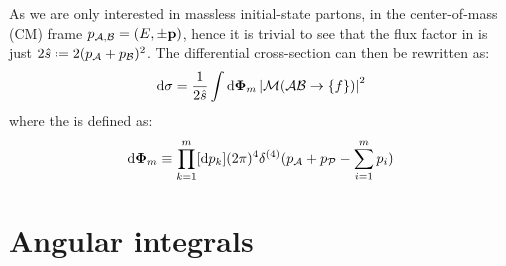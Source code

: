 As we are only interested in massless initial-state partons, in the center-of-mass (CM) frame $ p_{\mathcal{A},\mathcal{B}} = (E, \pm\mathbf{p}) $, hence it is trivial to see that the flux factor in  is just $ 2\hat{s} \defeq 2 (p_\mathcal{A} + p_\mathcal{B})^2 $. The differential cross-section can then be rewritten as:
\begin{equation}
  \mathrm{d} \sigma = \frac{1}{2\hat{s}} \int \mathrm{d} \boldsymbol{\Phi}_m \left\lvert\mathcal{M}(\mathcal{A}\mathcal{B} \rightarrow \{f\})\right\rvert^2
\end{equation}
where the  is defined as:
\begin{equation}
  \mathrm{d} \boldsymbol{\Phi}_m \equiv \prod_{k = 1}^m [\mathrm{d} p_k] (2\pi)^4 \delta^{(4)}(p_\mathcal{A} + p_\mathcal{P} - \sum_{i = 1}^m p_i)
\end{equation}

\section{Angular integrals}










